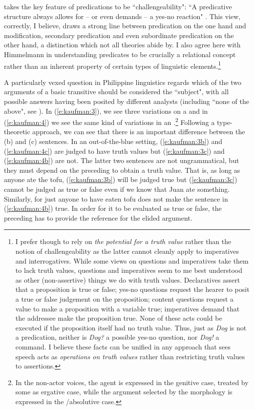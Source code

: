 \documentclass[output=paper]{langsci/langscibook}
\begin{document}
\citet{Himmelmann:1986} takes the key feature of predications to be ``challengeability": ``A predicative structure always allows for -- or even demands -- a yes-no reaction" \citep[26]{Himmelmann:1986}. This view, correctly, I believe, draws a strong line between predication on the one hand and modification, secondary predication and even subordinate predication on the other hand, a distinction which not all theories abide by. I also agree here with Himmelmann in understanding predicates to be crucially a relational concept rather than an inherent property of certain types of linguistic elements.\footnote{I prefer though to rely on \emph{the potential for a truth value} rather than the notion of challengeability as the latter cannot cleanly apply to imperatives and interrogatives. While some views on questions and imperatives take them to lack truth values, questions and imperatives seem to me best understood as other (non-assertive) things we do with truth values. Declaratives assert that a proposition is true or false; yes-no questions request the hearer to posit a true or false judgement on the proposition; content questions request a value to make a proposition with a variable true; imperatives demand that the addressee make the proposition true. None of these acts could be executed if the proposition itself had no truth value. Thus, just as \textit{Dog} is not a predication, neither is \textit{Dog?} a possible yes-no question, nor \textit{Dog!} a command. I believe these facts can be unified in any approach that sees speech acts as \emph{operations on truth values} rather than restricting truth values to assertions.}

A particularly vexed question in Philippine linguistics regards which of the two arguments of a basic transitive  should be considered the ``subject", with all possible answers having been posited by different analysts (including ``none of the above", see \citealt{Schachter:1976}). In (\ref{e:kaufman:3}), we see three variations on a   and in (\ref{e:kaufman:4}) we see the same kind of variations in an  .\footnote{In the non-actor voices, the agent is expressed in the genitive case, treated by some as ergative case, while the argument selected by the  morphology is expressed in the /absolutive case.} Following a type-theoretic approach, we can see that there is an important difference between the (b) and (c) sentences. In an out-of-the-blue setting, (\ref{e:kaufman:3b}) and (\ref{e:kaufman:4c}) are judged to have truth values but (\ref{e:kaufman:3c}) and (\ref{e:kaufman:4b}) are not. The latter two sentences are not ungrammatical, but they must depend on the preceding  to obtain a truth value. That is, as long as anyone ate the tofu, (\ref{e:kaufman:3b}) will be judged true but (\ref{e:kaufman:3c}) cannot be judged as true or false even if we know that Juan ate something. Similarly, for just anyone to have eaten tofu does not make the  sentence in (\ref{e:kaufman:4b}) true. In order for it to be evaluated as true or false, the preceding  has to provide the reference for the elided  argument. 
\end{document}
